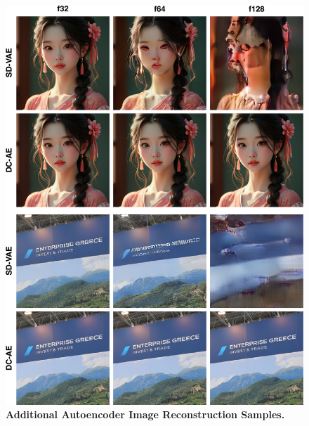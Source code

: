 \begin{figure}[ht]
    \centering
    \includegraphics[width=1\linewidth]{figures/src/ae_visualization_2.pdf}
    \caption{\textbf{Additional Autoencoder Image Reconstruction Samples.}}
    \label{fig:ae_visualization_2}
\end{figure}
